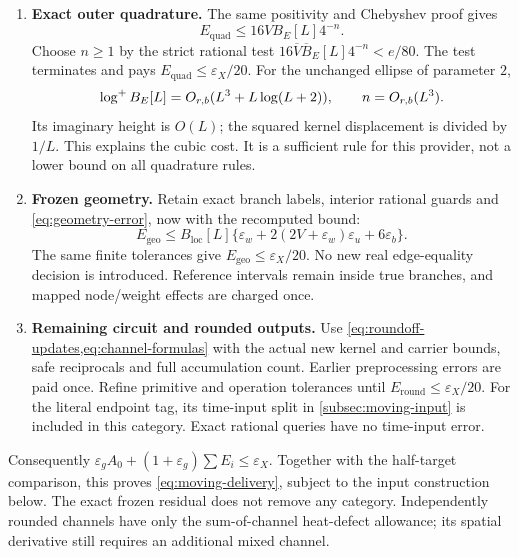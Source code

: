 \begin{enumerate}[leftmargin=*,itemsep=.55em]
\item \textbf{Exact outer quadrature.}
The same positivity and Chebyshev proof gives
\[
 E_{\mathrm{quad}}\le16VB_E[L]4^{-n}.
\]
Choose \(n\ge1\) by the strict rational test
\(16\overline V\overline B_E[L]4^{-n}<e/80\).
The test terminates and pays \(E_{\mathrm{quad}}\le\varepsilon_X/20\).
For the unchanged ellipse of parameter \(2\),
\begin{equation}
 \log^{+} B_E[L]=O_{r,b}(L^3+L\log(L+2)),\qquad
 n=O_{r,b}(L^3).
 \label{eq:moving-outer-order}
\end{equation}
Its imaginary height is \(O(L)\); the squared kernel displacement is
divided by \(1/L\). This explains the cubic cost. It is a sufficient
rule for this provider, not a lower bound on all quadrature rules.

\item \textbf{Frozen geometry.}
Retain exact branch labels, interior rational guards and
\eqref{eq:geometry-error}, now with the recomputed bound:
\[
 E_{\mathrm{geo}}\le B_{\mathrm{loc}}[L]
  \{\varepsilon_w+2(2V+\varepsilon_w)\varepsilon_u+6\varepsilon_b\}.
\]
The same finite tolerances give \(E_{\mathrm{geo}}\le\varepsilon_X/20\).
No new real edge-equality decision is introduced. Reference intervals
remain inside true branches, and mapped node/weight effects are charged
once.

\item \textbf{Remaining circuit and rounded outputs.}
Use \cref{eq:roundoff-updates,eq:channel-formulas} with the actual new
kernel and carrier bounds, safe reciprocals and full accumulation count.
Earlier preprocessing errors are paid once. Refine primitive and
operation tolerances until \(E_{\mathrm{round}}\le\varepsilon_X/20\).
For the literal endpoint tag, its time-input split in
\cref{subsec:moving-input} is included in this category. Exact rational
queries have no time-input error.
\end{enumerate}
Consequently
\(\varepsilon_gA_0+(1+\varepsilon_g)\sum E_i\le\varepsilon_X\).
Together with the half-target comparison, this proves
\eqref{eq:moving-delivery}, subject to the input construction below.
The exact frozen residual does not remove any category. Independently
rounded channels have only the sum-of-channel heat-defect allowance;
its spatial derivative still requires an additional mixed channel.

